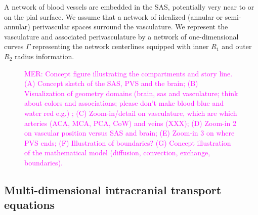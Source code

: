 \documentclass[fleqn,10pt]{wlscirep}
\newcommand{\mer}[1]{\textcolor{magenta}{#1}}
\begin{document}
A network of blood vessels are embedded in the SAS, potentially very near to or on the pial surface. We assume that a network of idealized (annular or semi-annular) perivascular spaces surround the vasculature. We represent the vasculature and associated perivasculature by a network of one-dimensional curves $\Gamma$ representing the network centerlines equipped with inner $R_1$ and outer $R_2$ radius information. 


\begin{figure}
  \caption{\mer{MER: Concept figure illustrating the compartments and story line. (A) Concept sketch of the SAS, PVS and the brain; (B) Visualization of geometry domains (brain, sas and vasculature; think about colors and associations; please don't make blood blue and water red e.g.) ; (C) Zoom-in/detail on vasculature, which are which arteries (ACA, MCA, PCA, CoW)  and veins (XXX); (D) Zoom-in 2 on vascular position versus SAS and brain; (E) Zoom-in 3 on where PVS ends; (F) Illustration of boundaries? (G) Concept illustration of the mathematical model (diffusion, convection, exchange, boundaries).}}
\label{fig:concept}
\end{figure}

\subsection*{Multi-dimensional intracranial transport equations}
\end{document}
